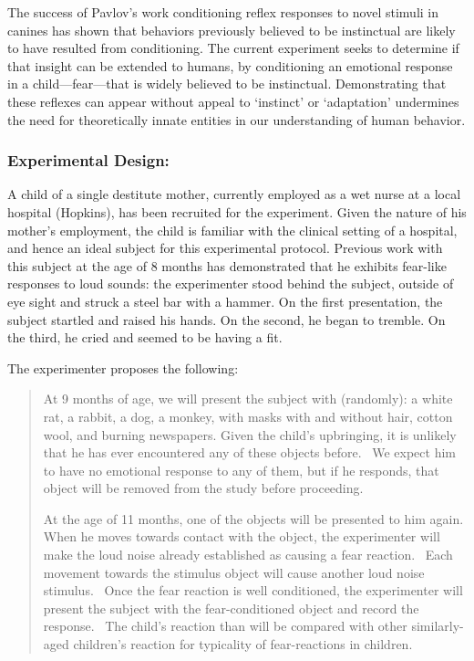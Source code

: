 \begin{refsection}
The success of Pavlov's work conditioning reflex responses to novel stimuli in canines has shown that behaviors previously believed to be instinctual are likely to have resulted from conditioning. The current experiment seeks to determine if that insight can be extended to humans, by conditioning an emotional response in a child—fear—that is widely believed to be instinctual. Demonstrating that these reflexes can appear without appeal to `instinct' or `adaptation' undermines the need for theoretically innate entities in our understanding of human behavior.

\subsubsection{Experimental Design:}
\label{experimentaldesign:}

A child of a single destitute mother, currently employed as a wet nurse at a local hospital (Hopkins), has been recruited for the experiment. Given the nature of his mother's employment, the child is familiar with the clinical setting of a hospital, and hence an ideal subject for this experimental protocol. Previous work with this subject at the age of 8 months has demonstrated that he exhibits fear-like responses to loud sounds: the experimenter stood behind the subject, outside of eye sight and struck a steel bar with a hammer. On the first presentation, the subject startled and raised his hands. On the second, he began to tremble. On the third, he cried and seemed to be having a fit.

The experimenter proposes the following:

\begin{quote}

At 9 months of age, we will present the subject with (randomly): a white rat, a rabbit, a dog, a monkey, with masks with and without hair, cotton wool, and burning newspapers. Given the child's upbringing, it is unlikely that he has ever encountered any of these objects before.  We expect him to have no emotional response to any of them, but if he responds, that object will be removed from the study before proceeding.

At the age of 11 months, one of the objects will be presented to him again. When he moves towards contact with the object, the experimenter will make the loud noise already established as causing a fear reaction.  Each movement towards the stimulus object will cause another loud noise stimulus.  Once the fear reaction is well conditioned, the experimenter will present the subject with the fear-conditioned object and record the response.  The child's reaction than will be compared with other similarly-aged children's reaction for typicality of fear-reactions in children.


\end{quote}
\end{refsection}
